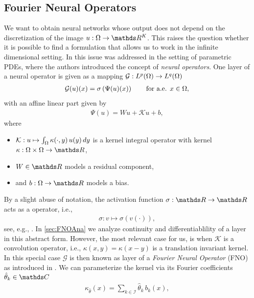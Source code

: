 \subsection{Fourier Neural Operators}
%
%
We want to obtain neural networks whose output does not depend on the discretization of the image $\img:\domain\to\R^K$. This raises the question whether it is possible to find a formulation that allows us to work in the infinite dimensional setting. In \cite{kovachki2021neural} this issue was addressed in the setting of parametric PDEs, where the authors introduced the concept of \emph{neural operators}. One layer of a neural operator is given as a mapping $\mathcal{G}:  L^p(\Omega) \rightarrow L^q(\Omega)$
%
\begin{align}\label{eq:layerdef}
\mathcal{G}(u)(x) = \sigma\left(\Psi(u)(x)\right) \qquad \text{for a.e. } x \in \Omega,
\end{align}
%
with an affine linear part given by
%
\begin{align}\label{eq:linearpart}
\Psi(u) = W u + \mathcal{K}u + b,
\end{align}
%
where
%
\begin{itemize}
\item $\mathcal{K}: u \mapsto \int_{\Omega} \kappa(\cdot, y)\, u(y)\,dy$ is a kernel integral operator with kernel $\kappa: \domain \times \domain \rightarrow \R$,
\item $W \in \R$ models a residual component,
\item and $b: \domain \rightarrow \R$ models a bias.
\end{itemize}
%
%
By a slight abuse of notation, the activation function $\sigma:\R\to\R$ acts as a \Nem{} operator, i.e.,
%
\begin{align}\label{eq:nemytskii}%
\sigma: v \mapsto \sigma(v(\cdot)),
\end{align}
%
see, e.g., \cite{tröltzsch}. In \cref{sec:FNOAna} we analyze continuity and differentiablility of a layer in this abstract form. However, the most relevant case for us, is when $\mathcal{K}$ is a convolution operator, i.e., $\kappa(x,y)=\kappa(x-y)$ is a translation invariant kernel. In this special case $\mathcal{G}$ is then known as layer of a \emph{Fourier Neural Operator} (FNO) as introduced in \cite{li2020fourier}. We can parameterize the kernel via its Fourier coefficients $\hat{\param}_k\in\C$
%
\begin{align}\label{eq:fnokernel}
\kappa_{\hat{\theta}}(x) = \sum_{k \in \mathcal{I}} \hat{\theta}_k\, b_k(x),
\end{align}
